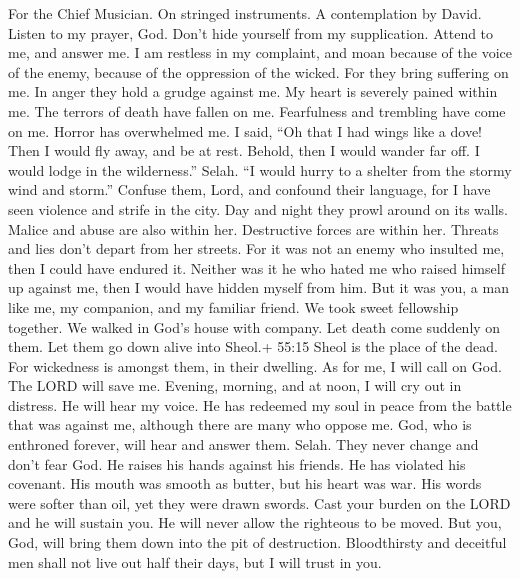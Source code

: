 For the Chief Musician. On stringed instruments. A contemplation by
David.  Listen to my prayer, God. Don't hide yourself from
my supplication.  Attend to me, and answer me. I am restless
in my complaint, and moan  because of the voice of the
enemy, because of the oppression of the wicked. For they bring suffering
on me. In anger they hold a grudge against me.  My heart is
severely pained within me. The terrors of death have fallen on me.
 Fearfulness and trembling have come on me. Horror has
overwhelmed me.  I said, ``Oh that I had wings like a dove!
Then I would fly away, and be at rest.  Behold, then I would
wander far off. I would lodge in the wilderness.'' Selah. 
``I would hurry to a shelter from the stormy wind and storm.''
 Confuse them, Lord, and confound their language, for I have
seen violence and strife in the city.  Day and night they
prowl around on its walls. Malice and abuse are also within her.
 Destructive forces are within her. Threats and lies don't
depart from her streets.  For it was not an enemy who
insulted me, then I could have endured it. Neither was it he who hated
me who raised himself up against me, then I would have hidden myself
from him.  But it was you, a man like me, my companion, and
my familiar friend.  We took sweet fellowship together. We
walked in God's house with company.  Let death come
suddenly on them. Let them go down alive into Sheol.+ 55:15 Sheol is the
place of the dead. For wickedness is amongst them, in their dwelling.
 As for me, I will call on God. The LORD will save me.
 Evening, morning, and at noon, I will cry out in distress.
He will hear my voice.  He has redeemed my soul in peace
from the battle that was against me, although there are many who oppose
me.  God, who is enthroned forever, will hear and answer
them. Selah. They never change and don't fear God.  He
raises his hands against his friends. He has violated his covenant.
 His mouth was smooth as butter, but his heart was war. His
words were softer than oil, yet they were drawn swords. 
Cast your burden on the LORD and he will sustain you. He will never
allow the righteous to be moved.  But you, God, will bring
them down into the pit of destruction. Bloodthirsty and deceitful men
shall not live out half their days, but I will trust in you.

